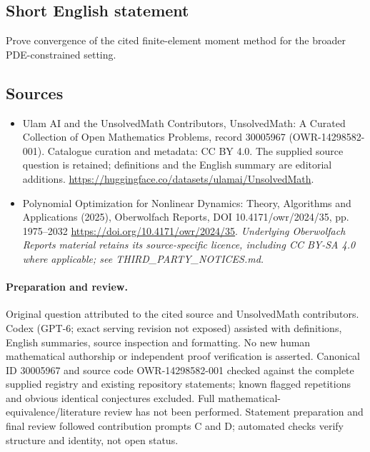 \documentclass[11pt]{article}
\begin{document}
\subsection{Short English statement}
Prove convergence of the cited finite-element moment method for the broader PDE-constrained setting.
\subsection{Sources}
\begin{itemize}
\item[\hypertarget{source:30005967:1}{S1}] Ulam AI and the UnsolvedMath Contributors, UnsolvedMath: A Curated Collection of Open Mathematics Problems, record 30005967 (OWR-14298582-001). Catalogue curation and metadata: CC BY 4.0. The supplied source question is retained; definitions and the English summary are editorial additions.
\url{https://huggingface.co/datasets/ulamai/UnsolvedMath}.
\item[\hypertarget{source:30005967:2}{S2}] Polynomial Optimization for Nonlinear Dynamics: Theory, Algorithms and Applications (2025), Oberwolfach Reports, DOI 10.4171/owr/2024/35, pp. 1975--2032
\url{https://doi.org/10.4171/owr/2024/35}.
\textit{Underlying Oberwolfach Reports material retains its source-specific licence, including CC BY-SA 4.0 where applicable; see THIRD\_PARTY\_NOTICES.md.}
\end{itemize}
\paragraph{Preparation and review.}
Original question attributed to the cited source and UnsolvedMath contributors. Codex (GPT-6; exact serving revision not exposed) assisted with definitions, English summaries, source inspection and formatting. No new human mathematical authorship or independent proof verification is asserted. Canonical ID 30005967 and source code OWR-14298582-001 checked against the complete supplied registry and existing repository statements; known flagged repetitions and obvious identical conjectures excluded. Full mathematical-equivalence/literature review has not been performed. Statement preparation and final review followed contribution prompts C and D; automated checks verify structure and identity, not open status.
\label{end:30005967}
\end{document}
